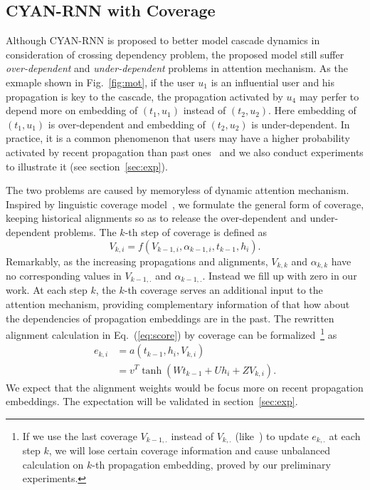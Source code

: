 \subsection{CYAN-RNN with Coverage}
\label{sec:coverage}

Although CYAN-RNN is proposed to better model cascade dynamics in consideration
of crossing dependency problem, the proposed model still suffer
\emph{over-dependent} and \emph{under-dependent} problems in
attention mechanism.
As the exmaple shown in Fig.~\ref{fig:mot}, if the user $u_1$ is an influential
user and his propagation is key to the cascade, the propagation activated by
$u_4$ may perfer to depend more on embedding of $(t_1, u_1)$ instead of $(t_2, u_2)$.
Here embedding of $(t_1, u_1)$ is over-dependent and embedding of $(t_2, u_2)$
is under-dependent. In practice, it is a common phenomenon that users may have a
higher probability activated by recent propagation than past ones~\cite{} and we
also conduct experiments to illustrate it (see section~\ref{sec:exp}).

The two problems are caused by memoryless of dynamic attention mechanism.
Inspired by linguistic coverage model~\cite{tu2016modeling}, we formulate the
general form of coverage, keeping historical alignments so
as to release the over-dependent and under-dependent problems. The $k$-th step
of coverage is defined as
\begin{equation}
\label{eq:cov}
V_{k,i}=f\left(V_{k-1, i}, \alpha_{k-1,i}, t_{k-1}, h_i\right).
\end{equation}
Remarkably, as the increasing propagations and alignments, $V_{k,k}$ and
$\alpha_{k,k}$ have no corresponding values in $V_{k-1,.}$ and
$\alpha_{k-1,.}$. Instead we fill up with zero in our work. 
At each step $k$, the $k$-th coverage serves an additional input to the
attention mechanism, providing complementary information of that how about the
dependencies of propagation embeddings are in the past. The rewritten
alignment calculation in Eq.~(\ref{eq:score}) by coverage can be
formalized~\footnote{
If we use the last coverage $V_{k-1,.}$ instead of
$V_{k,.}$ (like~\cite{tu2016modeling}) to update $e_{k,.}$ at each step $k$, 
we will lose certain coverage information and cause unbalanced
calculation on $k$-th propagation embedding, proved by our preliminary
experiments.} as
\begin{equation}
\label{eq:att_cov}
\begin{aligned}
e_{k,i} &= a(t_{k-1}, h_i, V_{k,i}) \\
& = v^T\tanh(W t_{k-1}+U h_i+Z V_{k,i}).
\end{aligned}
\end{equation}
We expect that the alignment weights would be focus more on recent propagation
embeddings. The expectation will be validated in section~\ref{sec:exp}.   


